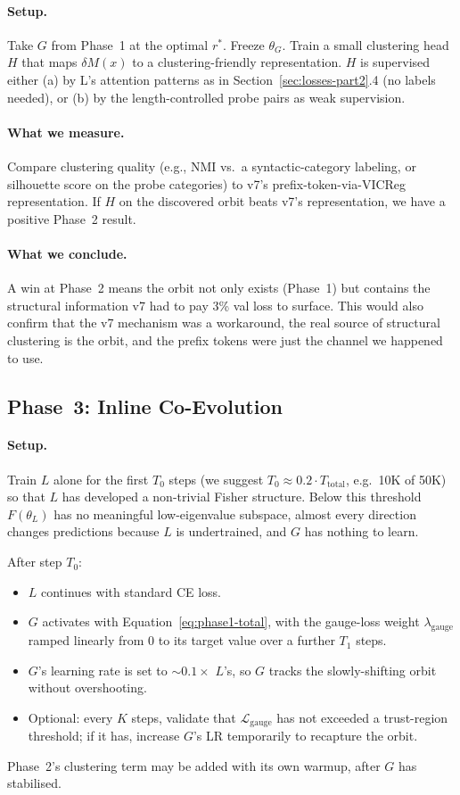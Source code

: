 \documentclass[11pt, a4paper]{article}
\theoremstyle{plain}
\theoremstyle{definition}
\theoremstyle{remark}
\begin{document}
\paragraph{Setup.}
Take $G$ from Phase~1 at the optimal $r^{*}$.
Freeze $\theta_{G}$. Train a small clustering head $H$ that maps $\delta M(x)$ to a clustering-friendly representation.
$H$ is supervised either (a) by L's attention patterns as in Section~\ref{sec:losses-part2}.4 (no labels needed), or (b) by the length-controlled probe pairs as weak supervision.

\paragraph{What we measure.}
Compare clustering quality (e.g., NMI vs.\ a syntactic-category labeling, or silhouette score on the probe categories) to v7's prefix-token-via-VICReg representation.
If $H$ on the discovered orbit beats v7's representation, we have a positive Phase~2 result.

\paragraph{What we conclude.}
A win at Phase~2 means the orbit not only exists (Phase~1) but contains the structural information v7 had to pay 3\% val loss to surface.
This would also confirm that the v7 mechanism was a workaround, the real source of structural clustering is the orbit, and the prefix tokens were just the channel we happened to use.

\subsection{Phase~3: Inline Co-Evolution}

\paragraph{Setup.}
Train $L$ alone for the first $T_{0}$ steps (we suggest $T_{0} \approx 0.2\cdot T_{\text{total}}$, e.g.\ 10K of 50K) so that $L$ has developed a non-trivial Fisher structure.
Below this threshold $F(\theta_{L})$ has no meaningful low-eigenvalue subspace, almost every direction changes predictions because $L$ is undertrained, and $G$ has nothing to learn.

After step $T_{0}$:
\begin{itemize}[nosep]
\item $L$ continues with standard CE loss.
\item $G$ activates with Equation~\ref{eq:phase1-total}, with the gauge-loss weight $\lambda_{\text{gauge}}$ ramped linearly from $0$ to its target value over a further $T_{1}$ steps.
\item $G$'s learning rate is set to $\sim 0.1\times$ $L$'s, so $G$ tracks the slowly-shifting orbit without overshooting.
\item Optional: every $K$ steps, validate that $\mathcal{L}_{\text{gauge}}$ has not exceeded a trust-region threshold; if it has, increase $G$'s LR temporarily to recapture the orbit.
\end{itemize}
Phase~2's clustering term may be added with its own warmup, after $G$ has stabilised.
\end{document}
